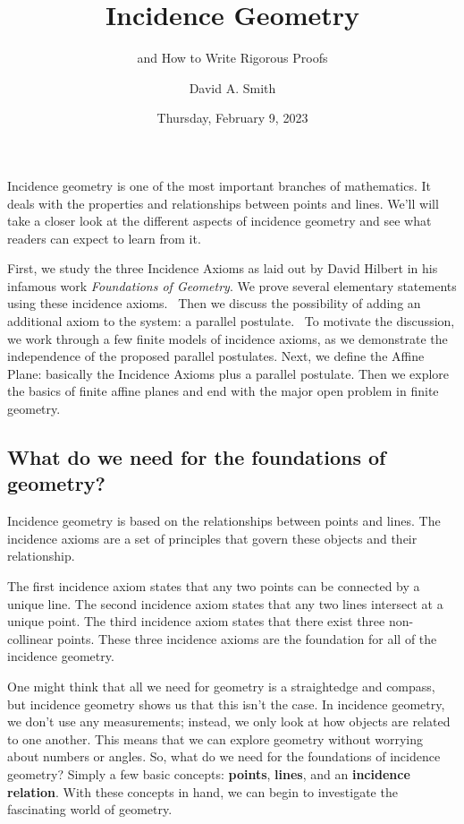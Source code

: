 \documentclass[
  twoside,
  12pt,
  letterpaper,
  fleqn]{article}
\title{Incidence Geometry}
\subtitle{and How to Write Rigorous Proofs}
\author{David A. Smith}
\date{Thursday, February 9, 2023}
\theoremstyle{definition}
\theoremstyle{definition}
\theoremstyle{plain}
\theoremstyle{plain}
\theoremstyle{remark}
\begin{document}
\maketitle
\ifdefined\Shaded\renewenvironment{Shaded}{\begin{tcolorbox}[breakable, frame hidden, enhanced, boxrule=0pt, borderline west={3pt}{0pt}{shadecolor}, interior hidden, sharp corners]}{\end{tcolorbox}}\fi

Incidence geometry is one of the most important branches of mathematics.
It deals with the properties and relationships between points and lines.
We'll will take a closer look at the different aspects of incidence
geometry and see what readers can expect to learn from it.

First, we study the three Incidence Axioms as laid out by David Hilbert
in his infamous work \emph{Foundations of Geometry}. We prove several
elementary statements using these incidence axioms.~ Then we discuss the
possibility of adding an additional axiom to the system: a parallel
postulate.~ To motivate the discussion, we work through a few finite
models of incidence axioms, as we demonstrate the independence of the
proposed parallel postulates. Next, we define the Affine Plane:
basically the Incidence Axioms plus a parallel postulate. Then we
explore the basics of finite affine planes and end with the major open
problem in finite geometry. ~

\hypertarget{what-do-we-need-for-the-foundations-of-geometry}{%
\subsection{What do we need for the foundations of
geometry?}\label{what-do-we-need-for-the-foundations-of-geometry}}

Incidence geometry is based on the relationships between points and
lines. The incidence axioms are a set of principles that govern these
objects and their relationship.

The first incidence axiom states that any two points can be connected by
a unique line. The second incidence axiom states that any two lines
intersect at a unique point. The third incidence axiom states that there
exist three non-collinear points. These three incidence axioms are the
foundation for all of the incidence geometry.

One might think that all we need for geometry is a straightedge and
compass, but incidence geometry shows us that this isn't the case. In
incidence geometry, we don't use any measurements; instead, we only look
at how objects are related to one another. This means that we can
explore geometry without worrying about numbers or angles. So, what do
we need for the foundations of incidence geometry? Simply a few basic
concepts: \textbf{points}, \textbf{lines}, and an \textbf{incidence
relation}. With these concepts in hand, we can begin to investigate the
fascinating world of geometry.
\end{document}
